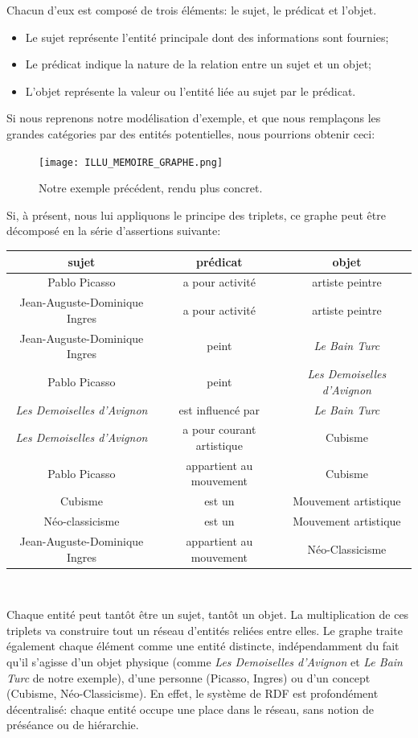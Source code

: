 \documentclass[a4paper,12pt,twoside]{book}
\begin{document}
Chacun d'eux est composé de trois éléments: le sujet, le prédicat et l'objet.
\begin{itemize}
    \item Le sujet représente l'entité principale dont des informations sont fournies;
    \item Le prédicat indique la nature de la relation entre un sujet et un objet;
    \item L'objet représente la valeur ou l'entité liée au sujet par le prédicat.
\end{itemize}

Si nous reprenons notre modélisation d'exemple, et que nous remplaçons les grandes catégories par des entités potentielles, nous pourrions obtenir ceci: 
\newpage
\begin{figure}[h]
    \centering
    \texttt{[image: ILLU\_MEMOIRE\_GRAPHE.png]}
    \caption{Notre exemple précédent, rendu plus concret.}
    \label{fig:enter-label}
\end{figure}

Si, à présent, nous lui appliquons le principe des triplets, ce graphe peut être décomposé en la série d'assertions suivante:
\begin{center}    
\begin{tabular}{|c|c|c|}
\hline
sujet & prédicat & objet \\
\hline
Pablo Picasso & a pour activité & artiste peintre \\
Jean-Auguste-Dominique Ingres  & a pour activité & artiste peintre \\
Jean-Auguste-Dominique Ingres & peint & \textit{Le Bain Turc} \\
Pablo Picasso & peint & \textit{Les Demoiselles d'Avignon}\\
\textit{Les Demoiselles d'Avignon} & est influencé par & \textit{Le Bain Turc}\\
\textit{Les Demoiselles d'Avignon} & a pour courant artistique & Cubisme \\
Pablo Picasso & appartient au mouvement & Cubisme \\
Cubisme & est un & Mouvement artistique \\
Néo-classicisme & est un & Mouvement artistique \\
Jean-Auguste-Dominique Ingres & appartient au mouvement & Néo-Classicisme \\
\hline
\end{tabular}\
\end{center}


Chaque entité peut tantôt être un sujet, tantôt un objet. La multiplication de ces triplets va construire tout un réseau d'entités reliées entre elles. Le graphe traite également chaque élément comme une entité distincte, indépendamment du fait qu'il s'agisse d'un objet physique (comme \textit{Les Demoiselles d'Avignon} et \textit{Le Bain Turc} de notre exemple), d'une personne (Picasso, Ingres) ou d'un concept (Cubisme, Néo-Classicisme). En effet, le système de RDF est profondément décentralisé: chaque entité occupe une place dans le réseau, sans notion de préséance ou de hiérarchie.\\
\end{document}
